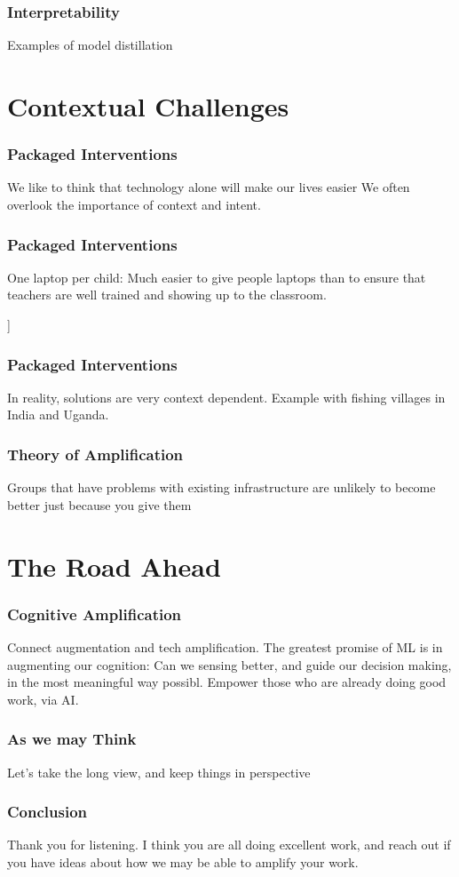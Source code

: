 \documentclass[10pt,mathserif]{beamer}
\begin{document}
\begin{frame}
  \frametitle{Interpretability}
  Examples of model distillation
\end{frame}

\section{Contextual Challenges}
\label{sec:label}

\begin{frame}
  \frametitle{Packaged Interventions}
  We like to think that technology alone will make our lives easier
  We often overlook the importance of context and intent.
\end{frame}

\begin{frame}
  \frametitle{Packaged Interventions}
  One laptop per child: Much easier to give people laptops than to ensure that
  teachers are well trained and showing up to the classroom.
\end{frame}

\begin{frame}]
  \frametitle{Packaged Interventions}
  In reality, solutions are very context dependent.
  Example with fishing villages in India and Uganda.
\end{frame}

\begin{frame}
  \frametitle{Theory of Amplification}
  Groups that have problems with existing infrastructure are unlikely to become
  better just because you give them
\end{frame}

\section{The Road Ahead}
\label{sec:label}

\begin{frame}
  \frametitle{Cognitive Amplification}
  Connect augmentation and tech amplification.
  The greatest promise of ML is in augmenting our cognition: Can we sensing
  better, and guide our decision making, in the most meaningful way possibl.
  Empower those who are already doing good work, via AI.
\end{frame}

\begin{frame}
  \frametitle{As we may Think}
  Let's take the long view, and keep things in perspective
\end{frame}

\begin{frame}
  \frametitle{Conclusion}
  Thank you for listening. I think you are all doing excellent work, and reach
  out if you have ideas about how we may be able to amplify your work.
\end{frame}
\end{document}
